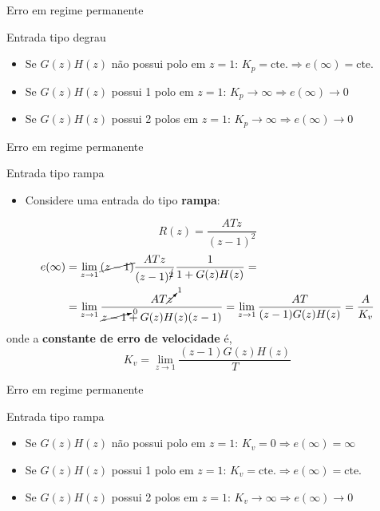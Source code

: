 \begin{frame}{Erro em regime permanente}
	\begin{block}{Entrada tipo degrau}
		\begin{itemize}
			\item Se $ G(z)H(z) $ não possui polo em $ z=1 $: $ K_p=\text{cte.} \Rightarrow e(\infty)=\text{cte.} $
			\item Se $ G(z)H(z) $ possui 1 polo em $ z=1 $: $ K_p\to \infty \Rightarrow e(\infty)\to 0 $
			\item Se $ G(z)H(z) $ possui 2 polos em $ z=1 $: $ K_p\to \infty \Rightarrow e(\infty)\to 0$
		\end{itemize}
	\end{block}
\end{frame}


\begin{frame}{Erro em regime permanente}
\begin{block}{Entrada tipo rampa}
\begin{itemize}
    \item Considere uma entrada do tipo \textbf{rampa}:
\end{itemize}
$$R(z)=\dfrac{ATz}{(z-1)^{2}}$$
	\begin{align*}
	e(\infty)&=\lim\limits_{z\to1}\cancel{(z-1)}\frac{ATz}{(z-1)^{\cancel{2}}}\frac{1}{1+G(z)H(z)}=\\
	&=\lim\limits_{z\to1}\frac{AT\cancelto{1}{z}}{\cancelto{0}{z-1}+G(z)H(z)(z-1)}=\lim\limits_{z\to1}\frac{AT}{(z-1)G(z)H(z)}=\dfrac{A}{K_v} 
	\end{align*}
	onde a \textbf{constante de erro de velocidade} é,
	\[ \boxed{K_v=\lim\limits_{z\to1}\frac{(z-1)G(z)H(z)}{T}} \]
\end{block}
\end{frame}


\begin{frame}{Erro em regime permanente}
	\begin{block}{Entrada tipo rampa}
		\begin{itemize}
			\item Se $ G(z)H(z) $ não possui polo em $ z=1 $: $ K_v=0 \Rightarrow e(\infty)=\infty $
			\item Se $ G(z)H(z) $ possui 1 polo em $ z=1 $: $ K_v=\text{cte.} \Rightarrow e(\infty) = \text{cte.} $
			\item Se $ G(z)H(z) $ possui 2 polos em $ z=1 $: $ K_v\to \infty \Rightarrow e(\infty)\to 0$
		\end{itemize}
	\end{block}
\end{frame}



